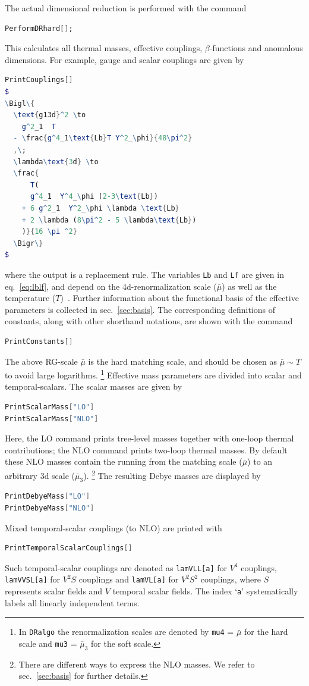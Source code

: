 \documentclass[11pt]{article}
\def\dralgo{{\tt DRalgo}}
\newcommand{\Lamd}{\bmu_{3}}
\newcommand{\LamD}{\bmu}
\newcommand{\bmu}{\bar\mu}
\begin{document}
The actual dimensional reduction is performed with the command
\begin{lstlisting}[language=Mathematica,mathescape=true]
PerformDRhard[];
\end{lstlisting}
This calculates all
thermal masses,
effective couplings,
$\beta$-functions and
anomalous dimensions.
For example, gauge and scalar couplings are given by
\begin{lstlisting}[language=Mathematica,mathescape=true]
PrintCouplings[]
$
\Bigl\{
  \text{g13d}^2 \to
    g^2_1  T
  - \frac{g^4_1\text{Lb}T Y^2_\phi}{48\pi^2}
  ,\;
  \lambda\text{3d} \to
  \frac{
      T(
      g^4_1  Y^4_\phi (2-3\text{Lb})
    + 6 g^2_1  Y^2_\phi \lambda \text{Lb}
    + 2 \lambda (8\pi^2 - 5 \lambda\text{Lb})
    )}{16 \pi ^2}
  \Bigr\}
$
\end{lstlisting}
where
the output is a replacement rule.
The variables
{\tt Lb} and
{\tt Lf} are
given in eq.~\eqref{eq:lblf}, and
depend on
the 4d-renormalization scale ($\LamD$)
as well as
the temperature ($T$)~\cite{Kajantie:1995dw,Farakos:1994kx}.
Further information about the functional basis
of the effective parameters is collected in sec.~\ref{sec:basis}.
The corresponding definitions of constants,
along with other shorthand notations,
are shown with the command
\begin{lstlisting}[language=Mathematica,mathescape=true]
PrintConstants[]
\end{lstlisting}

The above RG-scale $\LamD$ is the hard matching scale, and should be chosen
as $\LamD \sim T$ to avoid large logarithms.%
\footnote{
  In \dralgo{} the renormalization scales are denoted by
  {\tt mu4} = $\LamD$ for the hard scale and
  {\tt mu3} = $\Lamd$ for the soft scale.
}
Effective mass parameters are divided into scalar and temporal-scalars.
The scalar masses are given by
\begin{lstlisting}[language=Mathematica,mathescape=true]
PrintScalarMass["LO"]
PrintScalarMass["NLO"]
\end{lstlisting}
Here,
the LO command prints tree-level masses together with one-loop thermal contributions; the NLO command prints two-loop thermal masses.
By default these NLO masses contain
the running from the matching scale ($\LamD$) to an arbitrary 3d scale ($\Lamd$).%
\footnote{
  There are different ways to express the NLO masses.
  We refer to sec.~\ref{sec:basis} for further details.
}
The resulting Debye masses are displayed by
\begin{lstlisting}[language=Mathematica,mathescape=true]
PrintDebyeMass["LO"]
PrintDebyeMass["NLO"]
\end{lstlisting}
Mixed temporal-scalar couplings (to NLO)
are printed with
\begin{lstlisting}[language=Mathematica,mathescape=true]
PrintTemporalScalarCouplings[]
\end{lstlisting}
Such temporal-scalar couplings are denoted as
{\verb!lamVLL[a]!} for $V^4$ couplings,
{\verb!lamVVSL[a]!} for $V^2 S$ couplings and
{\verb!lamVL[a]!} for $V^2S^2$ couplings,
where
$S$ represents scalar fields and
$V$ temporal scalar fields.
The index
`{\tt a}'
systematically labels all linearly independent terms.
\end{document}
